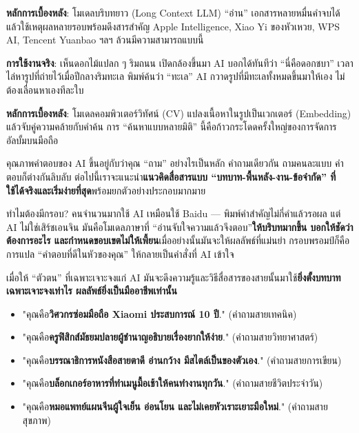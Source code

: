 \textbf{หลักการเบื้องหลัง}: โมเดลบริบทยาว (Long Context LLM) “อ่าน” เอกสารหลายหมื่นคำจบได้ แล้วใช้เหตุผลหลายรอบพร้อมดึงสารสำคัญ Apple Intelligence, Xiao Yi ของหัวเหวย, WPS AI, Tencent Yuanbao ฯลฯ ล้วนมีความสามารถแบบนี้


\textbf{การใช้งานจริง}: เห็นดอกไม้แปลก ๆ ริมถนน เปิดกล้องขึ้นมา AI บอกได้ทันทีว่า “นี่คือดอกชบา” เวลาไล่หารูปที่ถ่ายไว้เมื่อปีกลางริมทะเล พิมพ์ค้นว่า “ทะเล” AI กวาดรูปที่มีทะเลทั้งหมดขึ้นมาให้เอง ไม่ต้องเลื่อนหาเองทีละใบ

\textbf{หลักการเบื้องหลัง}: โมเดลคอมพิวเตอร์วิทัศน์ (CV) แปลงเนื้อหาในรูปเป็นเวกเตอร์ (Embedding) แล้วจับคู่ความคล้ายกับคำค้น การ “ค้นหาแบบหลายมิติ” นี้คือก้าวกระโดดครั้งใหญ่ของการจัดการอัลบั้มบนมือถือ


คุณภาพคำตอบของ AI ขึ้นอยู่กับว่าคุณ “ถาม” อย่างไรเป็นหลัก คำถามเดียวกัน ถามคนละแบบ คำตอบก็ต่างกันลิบลับ ต่อไปนี้เราจะแนะนำ\textbf{แนวคิดสื่อสารแบบ “บทบาท-พื้นหลัง-งาน-ข้อจำกัด” ที่ใช้ได้จริงและเริ่มง่ายที่สุด}พร้อมยกตัวอย่างประกอบมากมาย

\begin{tcbinfo}{ทำไมต้องมีกรอบ?}
คนจำนวนมากใช้ AI เหมือนใช้ Baidu — พิมพ์คำสำคัญไม่กี่คำแล้วรอผล แต่ AI ไม่ใช่เสิร์ชเอนจิน มันคือโมเดลภาษาที่ “อ่านจับใจความแล้วจึงตอบ”\textbf{ให้บริบทมากขึ้น บอกให้ชัดว่าต้องการอะไร และกำหนดขอบเขตไม่ให้เพี้ยน}เมื่ออย่างนั้นมันจะให้ผลลัพธ์ที่แม่นยำ กรอบพรอมป์ก็คือการแปล “คำตอบที่ดีในหัวของคุณ” ให้กลายเป็นคำสั่งที่ AI เข้าใจ

\end{tcbinfo}


เมื่อให้ “ตัวตน” ที่เฉพาะเจาะจงแก่ AI มันจะดึงความรู้และวิธีสื่อสารของสายนั้นมาใช้\textbf{ยิ่งตั้งบทบาทเฉพาะเจาะจงเท่าไร ผลลัพธ์ยิ่งเป็นมืออาชีพเท่านั้น}


\begin{itemize}
  \item "คุณคือ\textbf{วิศวกรซ่อมมือถือ Xiaomi ประสบการณ์ 10 ปี}." (คำถามสายเทคนิค)
  \item "คุณคือ\textbf{ครูฟิสิกส์มัธยมปลายผู้ชำนาญอธิบายเรื่องยากให้ง่าย}." (คำถามสายวิทยาศาสตร์)
  \item "คุณคือ\textbf{บรรณาธิการหนังสือสายตาดี อ่านกว้าง มีสไตล์เป็นของตัวเอง}." (คำถามสายการเขียน)
  \item "คุณคือ\textbf{บล็อกเกอร์อาหารที่ทำเมนูมื้อเช้าให้คนทำงานทุกวัน}." (คำถามสายชีวิตประจำวัน)
  \item "คุณคือ\textbf{หมอแพทย์แผนจีนผู้ใจเย็น อ่อนโยน และไม่เคยหัวเราะเยาะมือใหม่}." (คำถามสายสุขภาพ)
\end{itemize}

